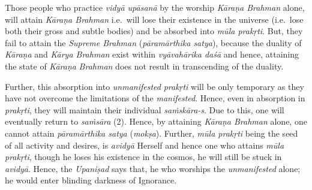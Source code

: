 Those people who practice \emph{vidyā upāsanā} by the worship \emph{Kāraṇa Brahman} alone, will attain \emph{Kāraṇa Brahman} i.e.\ will lose their existence in the universe (i.e.\ lose both their gross and subtle bodies) and be absorbed into \emph{mūla prakṛti}. But, they fail to attain the \emph{Supreme Brahman} (\emph{pāramārthika satya}), because the duality of \emph{Kāraṇa} and \emph{Kārya Brahman} exist within \emph{vyāvahārika daśā} and hence, attaining the state of \emph{Kāraṇa} \emph{Brahman} does not result in transcending of the duality.

Further, this absorption into \emph{unmanifested} \emph{prakṛti} will be only temporary as they have not overcome the limitations of the \emph{manifested}. Hence, even in absorption in \emph{prakṛti}, they will maintain their individual \emph{saṁskāra-s}. Due to this, one will eventually return to \emph{saṁsāra} (2). Hence, by attaining \emph{Kāraṇa Brahman} alone, one cannot attain \emph{pāramārthika satya} (\emph{mokṣa}). Further, \emph{mūla prakṛti} being the seed of all activity and desires, is \emph{avidyā} Herself and hence one who attains \emph{mūla prakṛti}, though he loses his existence in the cosmos, he will still be stuck in \emph{avidyā}. Hence, the \emph{Upaniṣad} says that, he who worships the \emph{unmanifested} alone; he would enter blinding darkness of Ignorance.

